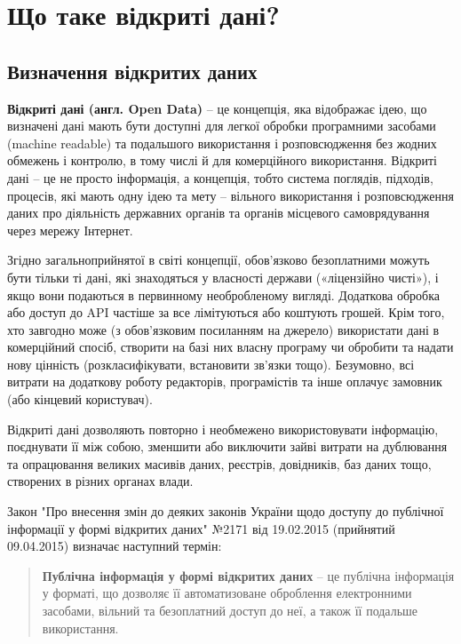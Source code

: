 \chapter{Що таке відкриті дані?}

\section{Визначення відкритих даних}

\textbf{Відкриті дані (англ. Open Data)} – це концепція, яка відображає ідею, що визначені дані мають бути доступні для легкої обробки програмними засобами (machine readable) та подальшого використання і розповсюдження без жодних обмежень і контролю, в тому числі й для комерційного використання. Відкриті дані – це не просто інформація, а концепція, тобто система поглядів, підходів, процесів, які мають одну ідею та мету – вільного використання і розповсюдження даних про діяльність державних органів та органів місцевого самоврядування через мережу Інтернет.

Згідно загальноприйнятої в світі концепції, обов’язково безоплатними можуть бути тільки ті дані, які знаходяться у власності держави («ліцензійно чисті»), і якщо вони подаються в первинному необробленому вигляді. Додаткова обробка або доступ до API частіше за все лімітуються або коштують грошей. Крім того, хто завгодно може (з обов’язковим посиланням на джерело) використати дані в комерційний спосіб, створити на базі них власну програму чи обробити та надати нову цінність (розкласифікувати, встановити зв’язки тощо). Безумовно, всі витрати на додаткову роботу редакторів, програмістів та інше оплачує замовник (або кінцевий користувач).

Відкриті дані дозволяють повторно і необмежено використовувати інформацію, поєднувати її між собою, зменшити або виключити зайві витрати на дублювання та опрацювання великих масивів даних, реєстрів, довідників, баз даних тощо, створених в різних органах влади.

Закон "Про внесення змін до деяких законів України щодо доступу до публічної інформації у формі відкритих даних" №2171 від 19.02.2015 (прийнятий 09.04.2015) визначає наступний термін:

\begin{quote}
\textbf{Публічна інформація у формі відкритих даних} – це публічна інформація у форматі, що дозволяє її автоматизоване оброблення електронними засобами, вільний та безоплатний доступ до неї, а також її подальше використання.
\end{quote}

